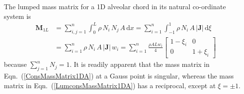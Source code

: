 The lumped mass matrix for a 1D alveolar chord in its natural co-ordinate system is 
\begin{equation}
\begin{aligned}
\mathbf{M}_{1L} & = \sum_{i,j=1}^n \int_0^L \rho \, N_i \, N_j \, A \, \mathrm{d} x  = \sum_{i=1}^n \int_{-1}^{1} \rho \, N_i \, A \, | \mathbf{J} | \,  \mathrm{d} \xi \\
& = \sum_{i=1}^n  \rho  \, N_i\, A \, | \mathbf{J} | \, w_i = 
\sum_{i=1}^n \frac{\rho A L w_i}{4} \begin{bmatrix} 
1 - \xi_i & 0 \\ 0 & 1 + \xi_i \end{bmatrix}
\end{aligned}
\label{LumconsMassMatrix1DA}
\end{equation}
because $\sum_{j=1}^n N_j = 1$.  It is readily apparent that the mass matrix in Eqn.~(\ref{ConsMassMatrix1DA}) at a Gauss point is singular, whereas the mass matrix in Eqn.~(\ref{LumconsMassMatrix1DA}) has a reciprocal, except at $\xi = \pm 1$. 


